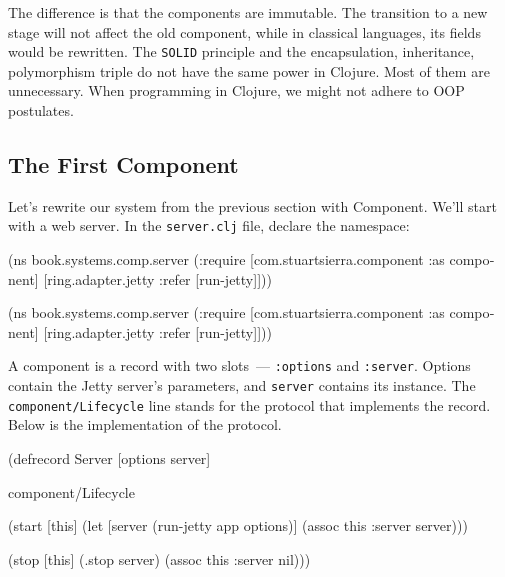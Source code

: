 
The difference is that the components are immutable. The transition to a new stage will not affect the old component, while in classical languages, its fields would be rewritten. The \verb|SOLID| principle and the encapsulation, inheritance, polymorphism triple do not have the same power in Clojure. Most of them are unnecessary. When programming in Clojure, we might not adhere to OOP postulates.

\subsection{The First Component}

Let's rewrite our system from the previous section with Component. We'll start with a web server. In the \verb|server.clj| file, declare the namespace:

\ifnarrow

\begin{english}
  \begin{clojure}
(ns book.systems.comp.server
  (:require
   [com.stuartsierra.component
    :as component]
   [ring.adapter.jetty
    :refer [run-jetty]]))
  \end{clojure}
\end{english}

\else

\begin{english}
  \begin{clojure}
(ns book.systems.comp.server
  (:require
   [com.stuartsierra.component :as component]
   [ring.adapter.jetty :refer [run-jetty]]))
  \end{clojure}
\end{english}

\fi

A component is a record with two slots~--- \verb|:options| and \verb|:server|. Options contain the Jetty server's parameters, and \verb|server| contains its instance. The \verb|component/Lifecycle| line stands for the protocol that implements the record. Below is the implementation of the protocol.

\ifnarrow

\begin{english}
  \begin{clojure}
(defrecord Server [options server]

  component/Lifecycle

  (start [this]
    (let [server (run-jetty app
                   options)]
      (assoc this :server server)))

  (stop [this]
    (.stop server)
    (assoc this :server nil)))
  \end{clojure}
\end{english}

